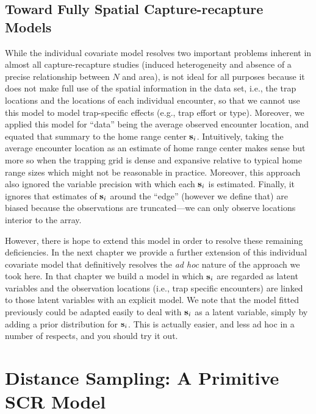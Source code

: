 \subsection{Toward Fully Spatial Capture-recapture Models}

While the individual covariate model resolves two important problems
inherent in almost all capture-recapture studies (induced
heterogeneity and absence of a precise relationship between $N$ and
area), is not ideal for all purposes because it does not make full use
of the spatial information in the data set, i.e., the trap locations
and the locations of each individual encounter, so that we cannot use
this model to model trap-specific effects (e.g., trap effort or type).
Moreover, we applied this model for ``data'' being the average
observed encounter location,
and equated that summary to the home range center ${\bf s}_{i}$. Intuitively, taking
the average encounter location as an estimate of home range center
makes sense but more so when the trapping grid is dense and expansive
relative to typical home range sizes which might not be reasonable in
practice.
Moreover, this approach also
ignored the variable precision with which each ${\bf s}_{i}$ is
estimated. Finally, it ignores that  estimates of ${\bf s}_{i}$
around the ``edge'' (however we define that) are biased because the
observations are truncated---we can only observe locations interior to
the array.

However, there is hope to extend this model in order to resolve
these remaining deficiencies.  In the next chapter we provide a further
extension of this individual covariate model that definitively
resolves the {\it ad hoc} nature of the approach we
took here. In that chapter we build a model in which ${\bf s}_{i}$ are
regarded as latent variables and the observation locations (i.e., trap
specific encounters) are linked to those latent variables with an
explicit model. We note that the model fitted previously could be
adapted easily to deal with ${\bf s}_{i}$ as a latent variable, simply
by adding a prior distribution for ${\bf s}_{i}$.  This is actually
easier, and less ad hoc in a number of respects, and you should try it out.



\section{Distance Sampling: A Primitive SCR Model}


